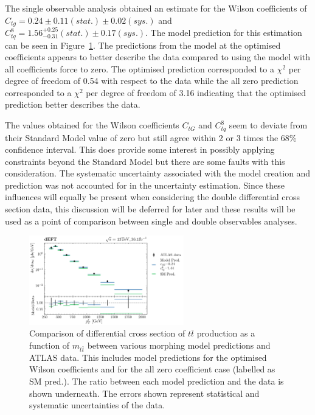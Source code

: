 \documentclass[a4paper,11pt]{article}
\begin{document}
The single observable analysis obtained an estimate for the Wilson coefficients of $C_{tg} = 0.24 \pm 0.11 (stat.) \pm 0.02 (sys.)$ and $C_{tq}^{8}=1.56^{+0.25}_{-0.31} (stat.) \pm 0.17 (sys.)$.
The model prediction for this estimation can be seen in Figure~\ref{fig:model_result_1D_2OP}.
The predictions from the model at the optimised coefficients appears to better describe the data compared to using the model with all coefficients force to zero.
The optimised prediction corresponded to a $\chi^{2}$ per degree of freedom of 0.54 with respect to the data while the all zero prediction corresponded to a $\chi^{2}$ per degree of freedom of 3.16 indicating that the optimised prediction better describes the data.

The values obtained for the Wilson coefficients $C_{tG}$ and $C_{tq}^{8}$ seem to deviate from their Standard Model value of zero but still agree within 2 or 3 times the 68\% confidence interval.
This does provide some interest in possibly applying constraints beyond the Standard Model but there are some faults with this consideration.
The systematic uncertainty associated with the model creation and prediction was not accounted for in the uncertainty estimation.
Since these influences will equally be present when considering the double differential cross section data, this discussion will be deferred for later and these results will be used as a point of comparison between single and double observables analyses.


\begin{figure}[htb]
    \centering
    \includegraphics[width=0.6\textwidth]{plots/ATLAS_model_result_1D_2OP.png}
    \caption{Comparison of differential cross section of $t\bar{t}$ production as a function of $m_{t\bar{t}}$ between various morphing model predictions and ATLAS data. This includes model predictions for the optimised Wilson coefficients and for the all zero coefficient case (labelled as SM pred.). The ratio between each model prediction and the data is shown underneath. The errors shown represent statistical and systematic uncertainties of the data.}
    \label{fig:model_result_1D_2OP}
\end{figure}
\end{document}
